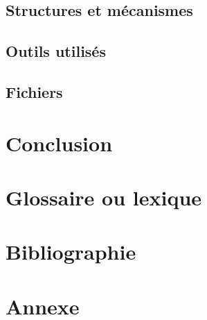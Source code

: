 \documentclass[10pt]{article}
\begin{document}
   \subsection{Structures et mécanismes}
   \subsection{Outils utilisés}
   \subsection{Fichiers}
   
\section{Conclusion}

\section{Glossaire ou lexique}

\section{Bibliographie}

\section{Annexe}
\end{document}

